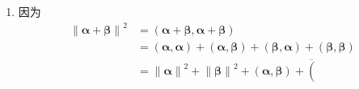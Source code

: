 \begin{formal}
\begin{Proof}
\begin{enumerate}[label={\textup{(\arabic*)}}]
\begin{align*}
                0\leqslant \left\lVert \bm{\gamma}\right\rVert ^2&=\left(
                    \bm{\gamma},\bm{\gamma}
                \right)\\
                &=\left(
                    \bm{\beta}-\frac{
                        \left(
                            \bm{\beta},\bm{\alpha}
                        \right)
                    }{
                        \left\lVert \bm{\alpha}\right\rVert ^2
                    }\bm{\alpha},\bm{\beta}-\frac{
                        \left(
                            \bm{\beta},\bm{\alpha}
                        \right)
                    }{
                        \left\lVert \bm{\alpha}\right\rVert ^2
                    }\bm{\alpha}
                \right)\\
                &=\left(
                    \bm{\beta},\bm{\beta}
                \right)-\frac{
                    \left(
                        \bm{\beta},\bm{\alpha}
                    \right)
                }{
                    \left\lVert \bm{\alpha}\right\rVert ^2
                }\left(
                    \bm{\alpha},\bm{\beta}
                \right)\\
                &=\left\lVert \bm{\beta}\right\rVert ^2-\frac{
                   \left| \left(
                        \bm{\beta},\bm{\alpha}
                    \right)\right|^2
                }{
                    \left\lVert \bm{\alpha}\right\rVert ^2
                }
            \end{align*}即\[
            \left|\left(
            \bm{\alpha},\bm{\beta}
        \right)\right|\leqslant \left\lVert \bm{\alpha}\right\rVert \left\lVert \bm{\beta}\right\rVert\]且等号成立当且仅当$\bm{\gamma}=\bm{0}$即$\bm{\beta}$与$\bm{\alpha}$线性相关.
        \item 因为\begin{align*}
            \left\lVert \bm{\alpha}+\bm{\beta}\right\rVert ^2&=\left(
                \bm{\alpha}+\bm{\beta},\bm{\alpha}+\bm{\beta}
            \right)\\
            &=\left(
                \bm{\alpha},\bm{\alpha}
            \right)+\left(
                \bm{\alpha},\bm{\beta}
            \right)+\left(
                \bm{\beta},\bm{\alpha}
            \right)+\left(
                \bm{\beta},\bm{\beta}
            \right)\\
            &=\left\lVert \bm{\alpha}\right\rVert ^2+\left\lVert \bm{\beta}\right\rVert ^2+\left(
                \bm{\alpha},\bm{\beta}
            \right)+\overline{
                \left(
}
\end{align*}
\end{enumerate}
\end{Proof}
\end{formal}
